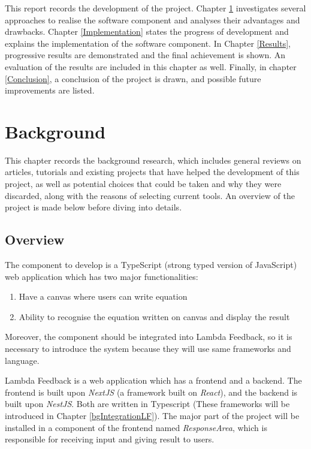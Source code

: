 \documentclass[12pt,twoside]{report}
\begin{document}
This report records the development of the project. Chapter \ref{Background}
investigates several approaches to realise the software component and analyses
their advantages and drawbacks. Chapter \ref{Implementation} states the progress
of development and explains the implementation of the software component. In
Chapter \ref{Results}, progressive results are demonstrated and the final
achievement is shown. An evaluation of the results are included in this chapter
as well. Finally, in chapter \ref{Conclusion}, a conclusion of the project is drawn, and possible future improvements are listed.



\chapter{Background}
\label{Background}

This chapter records the background research, which includes general reviews on
articles, tutorials and existing projects that have helped the development of
this project, as well as potential choices that could be taken and why they were
discarded, along with the reasons of selecting current tools. An overview of the project is made below before diving into details.

\section*{Overview}
\label{bgOverview}

The component to develop is a TypeScript (strong typed version of JavaScript) web application which has two major functionalities:
\begin{enumerate}
    \item Have a canvas where users can write equation
    \item Ability to recognise the equation written on canvas and display the result
\end{enumerate}

Moreover, the component should be integrated into Lambda Feedback, so it is necessary to introduce the system because they will use same frameworks and language.

Lambda Feedback is a web application which has a frontend and a backend.
The frontend is built upon \textit{NextJS} (a framework built on \textit{React}), and the backend is built upon \textit{NestJS}. Both
are written in Typescript (These frameworks will be introduced in Chapter \ref{bgIntegrationLF}). The major part of the project will be installed in a component of the frontend named \textit{ResponseArea}, which is responsible for receiving input and giving result to users.
\end{document}
